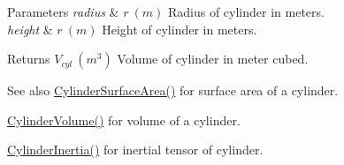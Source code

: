 \begin{DoxyParams}{Parameters}
{\em radius} & $ r\ (m)$ Radius of cylinder in meters. \\
\hline
{\em height} & $ r\ (m)$ Height of cylinder in meters. \\
\hline
\end{DoxyParams}
\begin{DoxyReturn}{Returns}
$ V_{cyl}\ (m^3)$ Volume of cylinder in meter cubed. 
\end{DoxyReturn}
\begin{DoxySeeAlso}{See also}
\mbox{\hyperlink{group___e_g_x_math-_geometry-_cylinder_gaf14619f5d525e14150a43b9898adb258}{Cylinder\+Surface\+Area()}} for surface area of a cylinder. 

\mbox{\hyperlink{group___e_g_x_math-_geometry-_cylinder_ga9d1aa08f778f9ccbd79953063f11bc9b}{Cylinder\+Volume()}} for volume of a cylinder. 

\mbox{\hyperlink{group___e_g_x_math-_geometry-_cylinder_ga5d9256549303e88a49b72e3d4c2c4a6d}{Cylinder\+Inertia()}} for inertial tensor of cylinder. 
\end{DoxySeeAlso}
